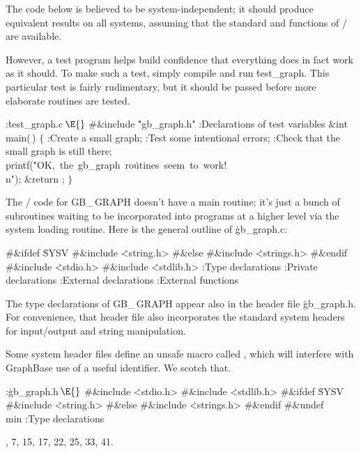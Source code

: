 \fi

The code below is believed to be system-independent; it should
produce equivalent results on all systems, assuming that the standard
 and  functions of \CEE/ are available.

However, a test program helps build confidence that everything does in fact
work as it should. To make such a test, simply compile and run \.{test\_graph}.
This particular test is fairly rudimentary, but it should be passed before
more elaborate routines are tested.

\Y\B\4:\.{test\_graph.c\,}\X${}\E{}$\6
\8\#\&{include} \.{"gb\_graph.h"}\6
:Declarations of test variables\X\7
\1\1\&{int} \\{main}(\,)\2\2\6
${}\{{}$\1\6
:Create a small graph\X;\6
:Test some intentional errors\X;\6
:Check that the small graph is still there\X;\6
\\{printf}(\.{"OK,\ the\ gb\_graph\ ro}\)\.{utines\ seem\ to\ work!}\)\.{%
\\n"});\6
\&{return} ;\6
\4${}\}{}$\2\par
\fi

The \CEE/ code for {\sc GB\_\,GRAPH} doesn't have a main routine;
it's just a bunch of subroutines waiting to be incorporated into
programs at a higher level via the system loading routine. Here is
the general outline of \.{gb\_graph.c}:

\Y\B\8\#\&{ifdef} \.{SYSV}\6
\8\#\&{include} \.{<string.h>}\6
\8\#\&{else}\6
\8\#\&{include} \.{<strings.h>}\6
\8\#\&{endif}\6
\8\#\&{include} \.{<stdio.h>}\6
\8\#\&{include} \.{<stdlib.h>}\6
\ATH\7
:Type declarations\X\6
:Private declarations\X\6
:External declarations\X\6
:External functions\X\par
\fi

The type declarations of {\sc GB\_\,GRAPH} appear also in the header file
\.{gb\_graph.h}. For convenience, that header file also incorporates the
standard system headers for input/output and string manipulation.

Some system header files define an unsafe macro called , which will
interfere with GraphBase use of a useful identifier. We scotch that.

\Y\B\4:\.{gb\_graph.h\,}\X${}\E{}$\6
\8\#\&{include} \.{<stdio.h>}\6
\8\#\&{include} \.{<stdlib.h>}\6
\8\#\&{ifdef} \.{SYSV}\6
\8\#\&{include} \.{<string.h>}\6
\8\#\&{else}\6
\8\#\&{include} \.{<strings.h>}\6
\8\#\&{endif}\6
\8\#\&{undef} \\{min}\6
:Type declarations\X\par
{}, 7, 15, 17, 22, 25, 33, 41.\fi

